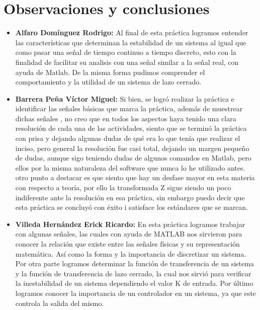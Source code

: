 \section{Observaciones y conclusiones}

\begin{itemize}
	\item \textbf{Alfaro Domínguez Rodrigo:}
	Al final de esta práctica logramos entender las características que determinan la estabilidad de un sistema al igual que como pasar una señal de tiempo continuo a tiempo discreto, esto con la finalidad de facilitar su analisis con una señal similar a la señal real, con ayuda de Matlab. De la misma forma pudimos comprender el comportamiento y la utilidad de un sistema de lazo cerrado.
	\item \textbf{Barrera Peña Víctor Miguel:} 
	Si bien, se logró realizar la práctica e identificar las señales básicas que marca la práctica, además de muestrear dichas señales , no creo que en todos los aspectos haya tenido una clara resolución de cada una de las actividades, siento que se terminó la práctica con prisa y dejando algunas dudas de qué era lo que tenía que realizar el inciso, pero general la resolución fue casi total, dejando un margen pequeño de dudas, aunque sigo teniendo dudas de algunos comandos en Matlab, pero ellos por la misma naturaleza del software que nunca lo he utilizado antes. otro punto a destacar es que siento que hay un desfase mayor en esta materia con respecto a teoría, por ello la transformada Z sigue siendo un poco indiferente ante la resolución en esa práctica, sin embargo puedo decir que esta práctica se concluyó con éxito i satisface los estándares que se marcan.
	\item \textbf{Villeda Hernández Erick Ricardo:}
	En esta práctica logramos trabajar con algunas señales, las cuales con ayuda de MATLAB nos sirvieron para conocer la relación que existe entre las señales físicas  y su representación matemática. Así como la forma y la importancia de discretizar un sistema. Por otra parte logramos determinar la función de transferencia de un sistema y la función de transferencia de lazo cerrado, la cual nos sirvió para verificar la inestabilidad de un sistema dependiendo el valor K de entrada. Por último logramos conocer la importancia de un controlador en un sistema, ya que este controla la salida del mismo.

	
\end{itemize}
